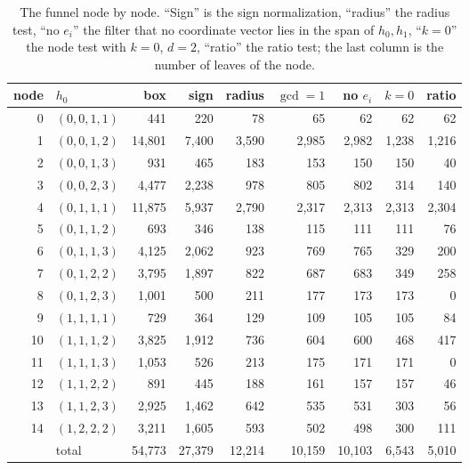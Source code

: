 \documentclass[11pt]{article}
\theoremstyle{remark}
\begin{document}
\begin{table}[ht]
\centering\small
\begin{tabular}{rlrrrrrrr}
\toprule
node & $h_0$ & box & sign & radius & $\gcd=1$ & no $e_i$ & $k=0$ & ratio\\
\midrule
0 & $(0,0,1,1)$ & 441 & 220 & 78 & 65 & 62 & 62 & 62\\
1 & $(0,0,1,2)$ & 14,801 & 7,400 & 3,590 & 2,985 & 2,982 & 1,238 & 1,216\\
2 & $(0,0,1,3)$ & 931 & 465 & 183 & 153 & 150 & 150 & 40\\
3 & $(0,0,2,3)$ & 4,477 & 2,238 & 978 & 805 & 802 & 314 & 140\\
4 & $(0,1,1,1)$ & 11,875 & 5,937 & 2,790 & 2,317 & 2,313 & 2,313 & 2,304\\
5 & $(0,1,1,2)$ & 693 & 346 & 138 & 115 & 111 & 111 & 76\\
6 & $(0,1,1,3)$ & 4,125 & 2,062 & 923 & 769 & 765 & 329 & 200\\
7 & $(0,1,2,2)$ & 3,795 & 1,897 & 822 & 687 & 683 & 349 & 258\\
8 & $(0,1,2,3)$ & 1,001 & 500 & 211 & 177 & 173 & 173 & 0\\
9 & $(1,1,1,1)$ & 729 & 364 & 129 & 109 & 105 & 105 & 84\\
10 & $(1,1,1,2)$ & 3,825 & 1,912 & 736 & 604 & 600 & 468 & 417\\
11 & $(1,1,1,3)$ & 1,053 & 526 & 213 & 175 & 171 & 171 & 0\\
12 & $(1,1,2,2)$ & 891 & 445 & 188 & 161 & 157 & 157 & 46\\
13 & $(1,1,2,3)$ & 2,925 & 1,462 & 642 & 535 & 531 & 303 & 56\\
14 & $(1,2,2,2)$ & 3,211 & 1,605 & 593 & 502 & 498 & 300 & 111\\
\midrule
 & total & 54,773 & 27,379 & 12,214 & 10,159 & 10,103 & 6,543 & 5,010\\
\bottomrule
\end{tabular}
\caption{The funnel node by node. ``Sign'' is the sign normalization, ``radius'' the radius test, ``no $e_i$'' the filter that no coordinate vector lies in the span of $h_0,h_1$, ``$k=0$'' the node test with $k=0$, $d=2$, ``ratio'' the ratio test; the last column is the number of leaves of the node.}
\label{tab:funnel}
\end{table}
\end{document}
